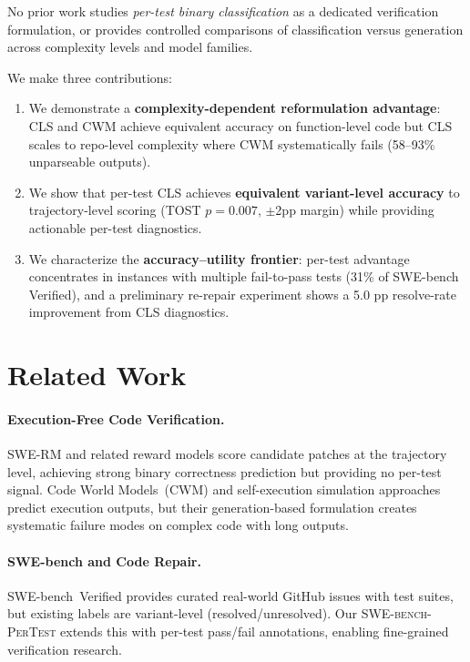 \documentclass[11pt,a4paper]{article}
\begin{document}
No prior work studies \emph{per-test binary classification} as a dedicated verification formulation, or provides controlled comparisons of classification versus generation across complexity levels and model families.

We make three contributions:
\begin{enumerate}
\item We demonstrate a \textbf{complexity-dependent reformulation advantage}: CLS and CWM achieve equivalent accuracy on function-level code but CLS scales to repo-level complexity where CWM systematically fails (58--93\% unparseable outputs).
\item We show that per-test CLS achieves \textbf{equivalent variant-level accuracy} to trajectory-level scoring (TOST $p{=}0.007$, $\pm$2pp margin) while providing actionable per-test diagnostics.
\item We characterize the \textbf{accuracy--utility frontier}: per-test advantage concentrates in instances with multiple fail-to-pass tests (31\% of SWE-bench Verified), and a preliminary re-repair experiment shows a 5.0 pp resolve-rate improvement from CLS diagnostics.
\end{enumerate}

\section{Related Work}

\paragraph{Execution-Free Code Verification.}
SWE-RM and related reward models score candidate patches at the trajectory level, achieving strong binary correctness prediction but providing no per-test signal.
Code World Models~(CWM) and self-execution simulation approaches predict execution outputs, but their generation-based formulation creates systematic failure modes on complex code with long outputs.

\paragraph{SWE-bench and Code Repair.}
SWE-bench~Verified provides curated real-world GitHub issues with test suites, but existing labels are variant-level (resolved/unresolved).
Our \textsc{SWE-bench-PerTest} extends this with per-test pass/fail annotations, enabling fine-grained verification research.
\end{document}
